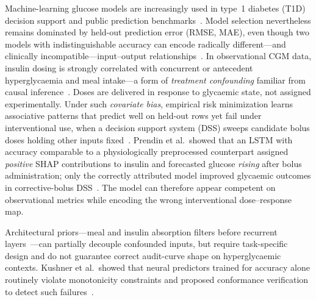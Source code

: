\documentclass[a4paper,fleqn]{cas-sc}
\begin{document}
Machine-learning glucose models are increasingly used in type~1 diabetes
(T1D) decision support and public prediction
benchmarks~\citep{oviedo2017,zhu2021,marling2020,beauchamp2021,katsarou2017,rodbard2016}.
Model selection nevertheless remains dominated by held-out prediction error
(RMSE, MAE), even though two models with indistinguishable accuracy can
encode radically different---and clinically incompatible---input--output
relationships~\citep{prendin2023,miller2019,yu2018,hagras2018}. In
observational CGM data, insulin dosing is strongly correlated with concurrent
or antecedent hyperglycaemia and meal intake---a form of \emph{treatment
confounding} familiar from causal
inference~\citep{scholkopf2021}. Doses are delivered in response to glycaemic
state, not assigned experimentally. Under such \emph{covariate bias}, empirical
risk minimization learns associative patterns that predict well on held-out
rows yet fail under interventional use, when a decision support system (DSS)
sweeps candidate bolus doses holding other inputs
fixed~\citep{prendin2023,cappon2023,kushner2020,geirhos2020}. Prendin et al.\
showed that an LSTM with accuracy comparable to a physiologically
preprocessed counterpart assigned \emph{positive} SHAP contributions to
insulin and forecasted glucose \emph{rising} after bolus administration; only
the correctly attributed model improved glycaemic outcomes in corrective-bolus
DSS~\citep{prendin2023,lundberg2017,ribeiro2016,zhu2023xai}. The model can
therefore appear competent on observational metrics while encoding the wrong
interventional dose--response map.

Architectural priors---meal and insulin absorption filters before recurrent
layers~\citep{prendin2023,zecchin2012,mirshekarian2017,pavan2020}---can
partially decouple confounded inputs, but require task-specific design and do
not guarantee correct audit-curve shape on hyperglycaemic contexts.
Kushner et al.\ showed that neural predictors trained for accuracy alone
routinely violate monotonicity constraints and proposed conformance
verification to detect such failures~\citep{kushner2020,kushner2020dt}.
\end{document}
